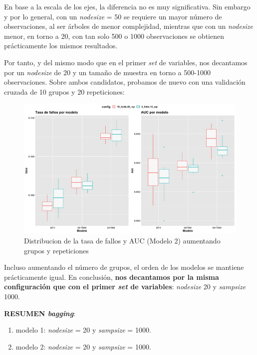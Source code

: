 \documentclass[
]{article}
\providecommand{\tightlist}{%
  \setlength{\itemsep}{0pt}\setlength{\parskip}{0pt}}
\begin{document}
En base a la escala de los ejes, la diferencia no es muy significativa.
Sin embargo y por lo general, con un \emph{nodesize} = 50 se requiere un
mayor número de observaciones, al ser árboles de menor complejidad,
mientras que con un \emph{nodesize} menor, en torno a 20, con tan solo
500 o 1000 observaciones se obtienen prácticamente los mismos
resultados.

Por tanto, y del mismo modo que en el primer \emph{set} de variables,
nos decantamos por un \emph{nodesize} de 20 y un tamaño de muestra en
torno a 500-1000 observaciones. Sobre ambos candidatos, probamos de
nuevo con una validación cruzada de 10 grupos y 20 repeticiones:

\begin{figure}[h!]

{\centering \includegraphics[width=0.99\linewidth,height=0.99\textheight,]{./charts/bagging/bis_03_comparacion_final_modelo2_5_10_folds} 

}

\caption{Distribucion de la tasa de fallos y AUC (Modelo 2) aumentando grupos y repeticiones}\label{fig:unnamed-chunk-79}
\end{figure}

Incluso aumentando el número de grupos, el orden de los modelos se
mantiene prácticamente igual. En conclusión, \textbf{nos decantamos por
la misma configuración que con el primer \emph{set} de variables}:
\emph{nodesize} 20 y \emph{sampsize} 1000.

\textbf{RESUMEN \emph{bagging}}:

\begin{enumerate}
\def\labelenumi{\arabic{enumi}.}
\tightlist
\item
  modelo 1: \emph{nodesize} = 20 y \emph{sampsize} = 1000.
\item
  modelo 2: \emph{nodesize} = 20 y \emph{sampsize} = 1000.
\end{enumerate}
\end{document}
